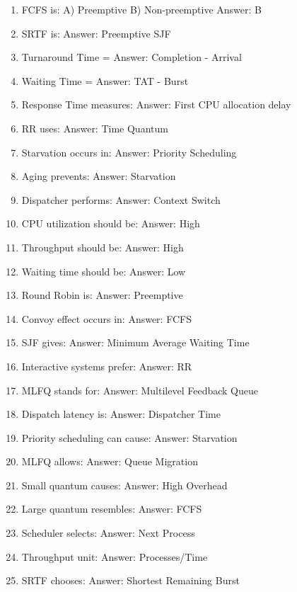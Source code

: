 \begin{enumerate}
\item FCFS is:
A) Preemptive
B) Non-preemptive
Answer: B

\item SRTF is:
Answer: Preemptive SJF

\item Turnaround Time =
Answer: Completion - Arrival

\item Waiting Time =
Answer: TAT - Burst

\item Response Time measures:
Answer: First CPU allocation delay

\item RR uses:
Answer: Time Quantum

\item Starvation occurs in:
Answer: Priority Scheduling

\item Aging prevents:
Answer: Starvation

\item Dispatcher performs:
Answer: Context Switch

\item CPU utilization should be:
Answer: High

\item Throughput should be:
Answer: High

\item Waiting time should be:
Answer: Low

\item Round Robin is:
Answer: Preemptive

\item Convoy effect occurs in:
Answer: FCFS

\item SJF gives:
Answer: Minimum Average Waiting Time

\item Interactive systems prefer:
Answer: RR

\item MLFQ stands for:
Answer: Multilevel Feedback Queue

\item Dispatch latency is:
Answer: Dispatcher Time

\item Priority scheduling can cause:
Answer: Starvation

\item MLFQ allows:
Answer: Queue Migration

\item Small quantum causes:
Answer: High Overhead

\item Large quantum resembles:
Answer: FCFS

\item Scheduler selects:
Answer: Next Process

\item Throughput unit:
Answer: Processes/Time

\item SRTF chooses:
Answer: Shortest Remaining Burst
\end{enumerate}

